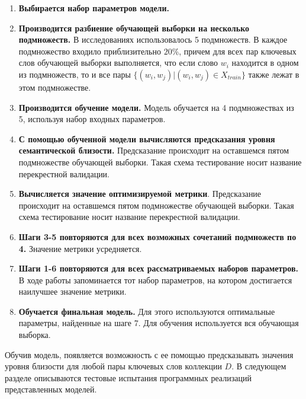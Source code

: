 \begin{enumerate}
    \item \textbf{Выбирается набор параметров модели.}
    \item \textbf{Производится разбиение обучающей выборки на несколько подмножеств.} В исследованиях использовалось 5 подмножеств. В каждое подмножество входило приблизительно $20\%$, причем для всех пар ключевых слов обучающей выборки выполняется, что если слово $w_i$ находится в одном из подмножеств, то и все пары $\{(w_i, w_j) | (w_i, w_j) \in X_{train}\}$ также лежат в этом подмножестве.
    \item \textbf{Производится обучение модели.} Модель обучается на 4 подмножествах из 5, используя набор входных параметров.
    \item \textbf{С помощью обученной модели вычисляются предсказания уровня семантической близости.} Предсказание происходит на оставшемся пятом подмножестве обучающей выборки. Такая схема тестирование носит название перекрестной валидации.
    \item \textbf{Вычисляется значение оптимизируемой метрики}. Предсказание происходит на оставшемся пятом подмножестве обучающей выборки. Такая схема тестирование носит название перекрестной валидации.
    \item \textbf{Шаги 3-5 повторяются для всех возможных сочетаний подмножеств по 4.} Значение метрики усредняется.
    \item \textbf{Шаги 1-6 повторяются для всех рассматриваемых наборов параметров.} В ходе работы запоминается тот набор параметров, на котором достигается наилучшее значение метрики.
    \item \textbf{Обучается финальная модель.} Для этого используются оптимальные параметры, найденные на шаге 7. Для обучения используется вся обучающая выборка.
\end{enumerate}

Обучив модель, появляется возможность с ее помощью предсказывать значения уровня близости для любой пары ключевых слов коллекции $D$. В следующем разделе описываются тестовые испытания программных реализаций представленных моделей.

